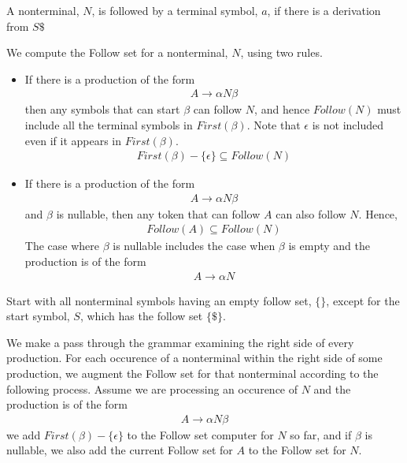 A nonterminal, $N$, is followed by a terminal symbol, $a$, if there is a derivation from $S\$$

We compute the Follow set for a nonterminal, $N$, using two rules.
\begin{itemize}
    \item If there is a production of the form
    \begin{align*}
        A \rightarrow \alpha N \beta
    \end{align*}
    then any symbols that can start $\beta$ can follow $N$, and hence $Follow(N)$ must include all the terminal symbols in $First(\beta)$. Note that $\epsilon$ is not included even if it appears in $First(\beta)$.
    \begin{align*}
        First(\beta) - \{\epsilon\} \subseteq Follow(N)
    \end{align*}
    \item If there is a production of the form
    \begin{align*}
        A \rightarrow \alpha N \beta
    \end{align*}
    and $\beta$ is nullable, then any token that can follow $A$ can also follow $N$. Hence,
    \begin{align*}
        Follow(A) \subseteq Follow(N)
    \end{align*}
    The case where $\beta$ is nullable includes the case when $\beta$ is empty and the production is of the form
    \begin{align*}
        A \rightarrow \alpha N
    \end{align*}
\end{itemize}

Start with all nonterminal symbols having an empty follow set, $\{\}$, except for the start symbol, $S$, which has the follow set $\{\$\}$.

We make a pass through the grammar examining the right side of every production. 
For each occurence of a nonterminal within the right side of some production, 
we augment the Follow set for that nonterminal according to the following process. 
Assume we are processing an occurence of $N$ and the production is of the form
\begin{align*}
    A \rightarrow \alpha N \beta
\end{align*}
we add $First(\beta) - \{\epsilon\}$ to the Follow set computer for $N$ so far, 
and if $\beta$ is nullable, we also add the current Follow set for $A$ to the Follow set for $N$.

